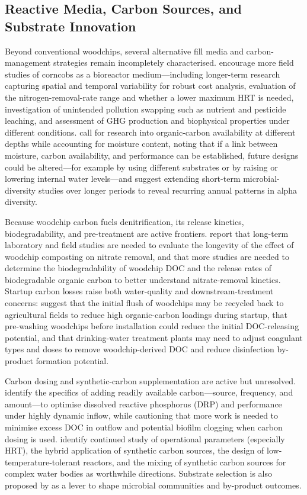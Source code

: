 \documentclass[11pt]{article}
\begin{document}
\subsection{Reactive Media, Carbon Sources, and Substrate Innovation}
Beyond conventional woodchips, several alternative fill media and carbon-management strategies remain incompletely characterised. \textcite{Law2023} encourage more field studies of corncobs as a bioreactor medium---including longer-term research capturing spatial and temporal variability for robust cost analysis, evaluation of the nitrogen-removal-rate range and whether a lower maximum HRT is needed, investigation of unintended pollution swapping such as nutrient and pesticide leaching, and assessment of GHG production and biophysical properties under different conditions. \textcite{Porter2015} call for research into organic-carbon availability at different depths while accounting for moisture content, noting that if a link between moisture, carbon availability, and performance can be established, future designs could be altered---for example by using different substrates or by raising or lowering internal water levels---and suggest extending short-term microbial-diversity studies over longer periods to reveal recurring annual patterns in alpha diversity.

Because woodchip carbon fuels denitrification, its release kinetics, biodegradability, and pre-treatment are active frontiers. \textcite{Kouanda2021} report that long-term laboratory and field studies are needed to evaluate the longevity of the effect of woodchip composting on nitrate removal, and that more studies are needed to determine the biodegradability of woodchip DOC and the release rates of biodegradable organic carbon to better understand nitrate-removal kinetics. Startup carbon losses raise both water-quality and downstream-treatment concerns: \textcite{Abusallout2017} suggest that the initial flush of woodchips may be recycled back to agricultural fields to reduce high organic-carbon loadings during startup, that pre-washing woodchips before installation could reduce the initial DOC-releasing potential, and that drinking-water treatment plants may need to adjust coagulant types and doses to remove woodchip-derived DOC and reduce disinfection by-product formation potential.

Carbon dosing and synthetic-carbon supplementation are active but unresolved. \textcite{Rivas2020} identify the specifics of adding readily available carbon---source, frequency, and amount---to optimise dissolved reactive phosphorus (DRP) and performance under highly dynamic inflow, while cautioning that more work is needed to minimise excess DOC in outflow and potential biofilm clogging when carbon dosing is used. \textcite{Zhang2021b} identify continued study of operational parameters (especially HRT), the hybrid application of synthetic carbon sources, the design of low-temperature-tolerant reactors, and the mixing of synthetic carbon sources for complex water bodies as worthwhile directions. Substrate selection is also proposed by \textcite{Hartfiel2022} as a lever to shape microbial communities and by-product outcomes.
\end{document}
